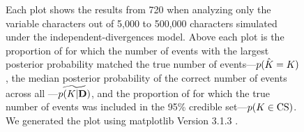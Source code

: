 \begin{figure}[htbp]
\begin{center}
{        Each plot shows the results from 720 \datasets when analyzing only the
        variable characters out of 5,000 to 500,000 characters simulated under
        the independent-divergences model.
        Above each plot is
        the proportion of \datasets for which the number of events with the largest
        posterior probability matched the true number of events---$p(\hat{K_{}}
        = K_{})$,
        the median posterior probability of the correct number of events across all
        \datasets---$\widetilde{p(K_{}|\mathbf{D})}$, and
        the proportion of \datasets for which the true number of events was
        included in the 95\% credible set---$p(K_{} \in
        \textrm{CS})$.
        We generated the plot using matplotlib Version 3.1.3
        \citep{matplotlib}.
        }
        \label{fig:varonlyneventsgridbysize}
    \end{center}
\end{figure}

